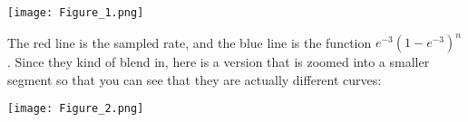 \documentclass[11pt]{article}
\theoremstyle{definition}
\begin{document}
\texttt{[image: Figure\_1.png]}

The red line is the sampled rate, and the blue line is the function $e^{-3}(1-e^{-3})^n$.  Since they kind of blend in, here is a version that is zoomed into a smaller segment so that you can see that they are actually different curves:

\texttt{[image: Figure\_2.png]}
\end{document}
